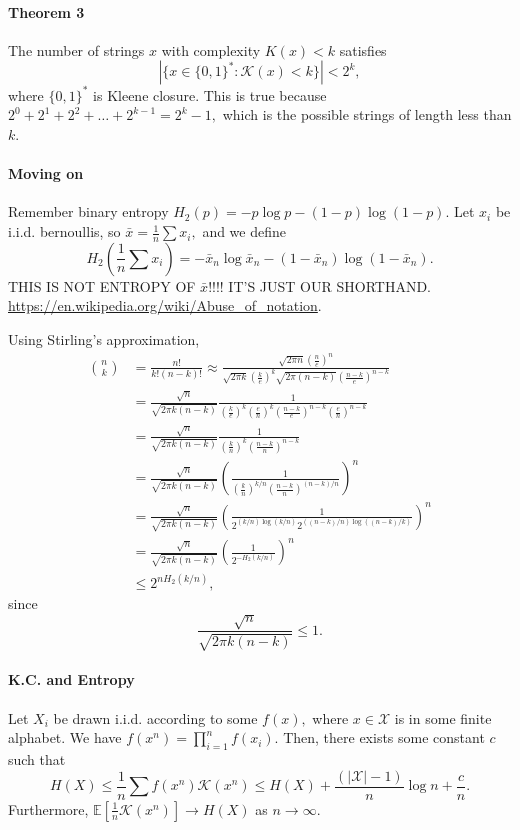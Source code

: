 \documentclass[12pt]{article}
\theoremstyle{remark}
\begin{document}
\paragraph{Theorem 3}
The number of strings $x$ with complexity $K(x)<k$ satisfies
\[|\{x\in\{0,1\}^\ast:\mathcal{K}(x)<k\}|<2^k,\] where $\{0,1\}^\ast$ is Kleene closure. This is true because $2^0+2^1+2^2+\dots+2^{k-1}=2^k-1,$ which is the possible strings of length less than $k.$


\paragraph{Moving on}
Remember binary entropy $H_2(p)=-p\log p-(1-p)\log(1-p).$ Let $x_i$ be i.i.d. bernoullis, so $\bar{x}=\frac{1}{n}\sum x_i,$ and we define
\[H_2\left(\frac{1}{n}\sum x_i\right)=-\bar{x}_n\log\bar{x}_n-(1-\bar{x}_n)\log(1-\bar{x}_n).\] THIS IS NOT ENTROPY OF $\bar{x}$!!!! IT'S JUST OUR SHORTHAND. \url{https://en.wikipedia.org/wiki/Abuse_of_notation}.

Using Stirling's approximation,
\begin{align*}\binom{n}{k}&=\frac{n!}{k!(n-k)!}\approx\frac{\sqrt{2\pi n}\left(\frac{n}{e}\right)^n}{\sqrt{2\pi k}\left(\frac{k}{e}\right)^k\sqrt{2\pi (n-k)}\left(\frac{n-k}{e}\right)^{n-k}}\\&=\frac{\sqrt{n}}{\sqrt{2\pi k(n-k)}}\frac{1}{\left(\frac{k}{e}\right)^k\left(\frac{e}{n}\right)^k\left(\frac{n-k}{e}\right)^{n-k}\left(\frac{e}{n}\right)^{n-k}}\\&=\frac{\sqrt{n}}{\sqrt{2\pi k(n-k)}}\frac{1}{\left(\frac{k}{n}\right)^k\left(\frac{n-k}{n}\right)^{n-k}}\\&=\frac{\sqrt{n}}{\sqrt{2\pi k(n-k)}}\left(\frac{1}{\left(\frac{k}{n}\right)^{k/n}\left(\frac{n-k}{n}\right)^{(n-k)/n}}\right)^{n}\\&=\frac{\sqrt{n}}{\sqrt{2\pi k(n-k)}}\left(\frac{1}{2^{(k/n)\log(k/n)}2^{((n-k)/n)\log((n-k)/k)}}\right)^{n}\\&=\frac{\sqrt{n}}{\sqrt{2\pi k(n-k)}}\left(\frac{1}{2^{-H_2(k/n)}}\right)^n\\&\le2^{nH_2(k/n)},\end{align*}
since
\[\frac{\sqrt{n}}{\sqrt{2\pi k(n-k)}}\le 1.\]

\paragraph{K.C. and Entropy}
Let $X_i$ be drawn i.i.d. according to some $f(x),$ where $x\in\mathcal{X}$ is in some finite alphabet. We have $f(x^n)=\prod_{i=1}^nf(x_i).$ Then, there exists some constant $c$ such that
\[H(X)\le\frac{1}{n}\sum f(x^n)\mathcal{K}(x^n)\le H(X)+\frac{(|\mathcal{X}|-1)}{n}\log n+\frac{c}{n}.\]
Furthermore, $\mathbb{E}\left[\frac{1}{n}\mathcal{K}(x^n)\right]\to H(X)$ as $n\to\infty.$
\end{document}
